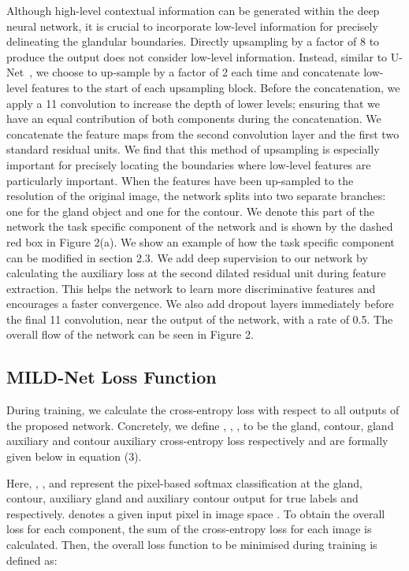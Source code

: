 \documentclass[3p]{elsarticle}
\begin{document}
Although high-level contextual information can be generated within the deep neural network, it is crucial to incorporate low-level information for precisely delineating the glandular boundaries. Directly upsampling by a factor of 8 to produce the output does not consider low-level information. Instead, similar to U-Net~\citep{ronneberger2015u}, we choose to up-sample by a factor of 2 each time and concatenate low-level features to the start of each upsampling block. Before the concatenation, we apply a 11 convolution to increase the depth of lower levels; ensuring that we have an equal contribution of both components during the concatenation. We concatenate the feature maps from the second convolution layer and the first two standard residual units. We find that this method of upsampling is especially important for precisely locating the boundaries where low-level features are particularly important. When the features have been up-sampled to the resolution of the original image, the network splits into two separate branches: one for the gland object and one for the contour. We denote this part of the network the task specific component of the network and is shown by the dashed red box in Figure 2(a). We show an example of how the task specific component can be modified in section 2.3. We add deep supervision to our network by calculating the auxiliary loss at the second dilated residual unit during feature extraction. This helps the network to learn more discriminative features and encourages a faster convergence. We also add dropout layers immediately before the final 11 convolution, near the output of the network, with a rate of 0.5. The overall flow of the network can be seen in Figure 2. 

\subsection{MILD-Net Loss Function}

During training, we calculate the cross-entropy loss with respect to all outputs of the proposed network. Concretely, we define , , ,  to be the gland, contour, gland auxiliary and contour auxiliary cross-entropy loss respectively and are formally given below in equation (3).



Here, , ,   and   represent the pixel-based softmax classification at the gland, contour, auxiliary gland and auxiliary contour output for true labels  and   respectively.  denotes a given input pixel in image space . To obtain the overall loss for each component, the sum of the cross-entropy loss for each image is calculated. Then, the overall loss function to be minimised during training is defined as:
\end{document}
